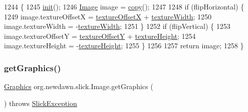 \begin{DoxyCode}
1244                                                                               \{
1245         \mbox{\hyperlink{classorg_1_1newdawn_1_1slick_1_1_image_a94d180c9218ba1444a0496a1898ec345}{init}}();
1246         \mbox{\hyperlink{classorg_1_1newdawn_1_1slick_1_1_image_a2c047fa669a8387f6c2d9bde33b3ee04}{Image}} image = \mbox{\hyperlink{classorg_1_1newdawn_1_1slick_1_1_image_a1a60f42d060227bc270a1a254eb36639}{copy}}();
1247         
1248         \textcolor{keywordflow}{if} (flipHorizontal) \{
1249             image.textureOffsetX = \mbox{\hyperlink{classorg_1_1newdawn_1_1slick_1_1_image_a0d11936067f8ad706c42a5feb411b5c8}{textureOffsetX}} + \mbox{\hyperlink{classorg_1_1newdawn_1_1slick_1_1_image_a0beda6fc601023aff97cce0d20d81f1e}{textureWidth}};
1250             image.textureWidth = -\mbox{\hyperlink{classorg_1_1newdawn_1_1slick_1_1_image_a0beda6fc601023aff97cce0d20d81f1e}{textureWidth}};
1251         \}
1252         \textcolor{keywordflow}{if} (flipVertical) \{
1253             image.textureOffsetY = \mbox{\hyperlink{classorg_1_1newdawn_1_1slick_1_1_image_a5c542a6d5fccbb7d56d74129b05cb78d}{textureOffsetY}} + \mbox{\hyperlink{classorg_1_1newdawn_1_1slick_1_1_image_a048cc714a1282eac215dbe4e722a3146}{textureHeight}};
1254             image.textureHeight = -\mbox{\hyperlink{classorg_1_1newdawn_1_1slick_1_1_image_a048cc714a1282eac215dbe4e722a3146}{textureHeight}};
1255         \}
1256         
1257         \textcolor{keywordflow}{return} image;
1258     \}
\end{DoxyCode}
\mbox{\label{classorg_1_1newdawn_1_1slick_1_1_image_aa4b12d568452597b58cdb69d49e625a4}} 
\subsubsection{\texorpdfstring{get\+Graphics()}{getGraphics()}}
{\footnotesize\ttfamily \mbox{\hyperlink{classorg_1_1newdawn_1_1slick_1_1_graphics}{Graphics}} org.\+newdawn.\+slick.\+Image.\+get\+Graphics (\begin{DoxyParamCaption}{ }\end{DoxyParamCaption}) throws \mbox{\hyperlink{classorg_1_1newdawn_1_1slick_1_1_slick_exception}{Slick\+Exception}}\hspace{0.3cm}{\ttfamily [inline]}}

